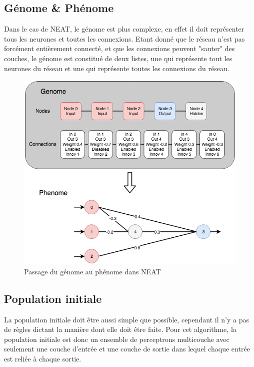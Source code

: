 \documentclass{article}
\begin{document}
\subsection{Génome \& Phénome}

Dans le cas de NEAT, le génome est plus complexe, en effet il doit représenter tous les neurones et toutes les connexions. Etant donné que le réseau n'est pas forcément entièrement connecté, et que les connexions peuvent "sauter" des couches, le génome est constitué de deux listes, une qui représente tout les neurones du réseau et une qui représente toutes les connexions du réseau. 

\begin{figure}[H]
\begin{center}
	\includegraphics[scale=0.55]{genomephenomeneat.png}
	\caption{Passage du génome au phénome dans NEAT}
\end{center}
\end{figure}

\subsection{Population initiale}

La population initiale doit être aussi simple que possible, cependant il n'y a pas de règles dictant la manière dont elle doit être faite. Pour cet algorithme, la population initiale est donc un ensemble de perceptrons multicouche avec seulement une couche d'entrée et une couche de sortie dans lequel chaque entrée est reliée à chaque sortie.
\end{document}
